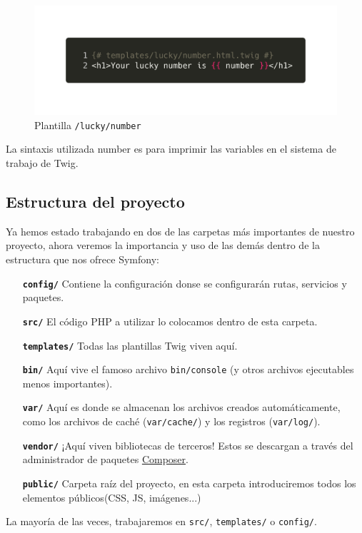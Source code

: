 \begin{figure}[ht]
  \centering
  \includegraphics[width=\textwidth]{../assets/lucky_number_template.png}
  \caption{Plantilla \texttt{/lucky/number}}
  \label{fig:lucky_number_template}
\end{figure}

La sintaxis utilizada {{ number }} es para imprimir las variables en el sistema de trabajo de Twig.

\subsection{Estructura del proyecto}
Ya hemos estado trabajando en dos de las carpetas más importantes de nuestro proyecto, ahora veremos la importancia y uso de las demás dentro de la estructura que nos ofrece Symfony:
\begin{itemize}
  \item[\textbf{\texttt{config/}}] Contiene la configuración donse se configurarán rutas, servicios y paquetes.
  \item[\textbf{\texttt{src/}}] El código PHP a utilizar lo colocamos dentro de esta carpeta.
  \item[\textbf{\texttt{templates/}}] Todas las plantillas Twig viven aquí.
  \item[\textbf{\texttt{bin/}}] Aquí vive el famoso archivo \texttt{bin/console} (y otros archivos ejecutables menos importantes).
  \item[\textbf{\texttt{var/}}] Aquí es donde se almacenan los archivos creados automáticamente, como los archivos de caché (\texttt{var/cache/}) y los registros (\texttt{var/log/}).
  \item[\textbf{\texttt{vendor/}}] ¡Aquí viven bibliotecas de terceros! Estos se descargan a través del administrador de paquetes \href{https://getcomposer.org/}{Composer}.
  \item[\textbf{\texttt{public/}}] Carpeta raíz del proyecto, en esta carpeta introduciremos todos los elementos públicos(CSS, JS, imágenes...)
\end{itemize}

La mayoría de las veces, trabajaremos en \texttt{src/}, \texttt{templates/} o \texttt{config/}.